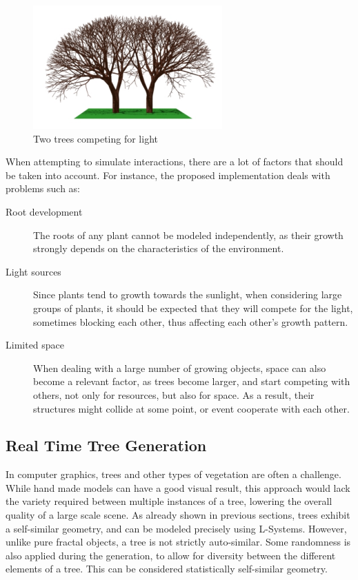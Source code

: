 \documentclass{acmtog}
\begin{document}
\begin{figure}[!htp]
  \begin{center}
    \includegraphics[width=0.8\columnwidth]{images/8_plants}
    \caption{Two trees competing for light \label{fig:relations_2}}
    \end{center}
\end{figure}

When attempting to simulate interactions, there are a lot of factors that should be taken into account. For instance, the proposed implementation deals with problems such as:
\begin{description}
  \item[Root development] The roots of any plant cannot be modeled independently, as their growth strongly depends on the characteristics of the environment.
  \item[Light sources] Since plants tend to growth towards the sunlight, when considering large groups of plants, it should be expected that they will compete for the light, sometimes blocking each other, thus affecting each other's growth pattern.
  \item[Limited space] When dealing with a large number of growing objects, space can also become a relevant factor, as trees become larger, and start competing with others, not only for resources, but also for space. As a result, their structures might collide at some point, or event cooperate with each other.
\end{description}

\subsection{Real Time Tree Generation}
\label{subsec:realtimetrees}

In computer graphics, trees and other types of vegetation are often a challenge. While hand made models can have a good visual result, this approach would lack the variety required between multiple instances of a tree, lowering the overall quality of a large scale scene. As already shown in previous sections, trees exhibit a self-similar geometry, and can be modeled precisely using L-Systems.
However, unlike pure fractal objects, a tree is not strictly auto-similar. Some randomness is also applied during the generation, to allow for diversity between the different elements of a tree. This can be considered statistically self-similar geometry.
\end{document}
